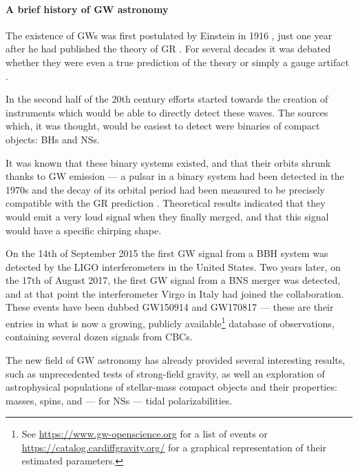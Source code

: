 \documentclass[main.tex]{subfiles}
\begin{document}

\paragraph{A brief history of GW astronomy}

The existence of \acp{GW} was first postulated by Einstein in 1916 \cites{1916SPAW.......688E}{1918SPAW.......154E}, just one year after he had published the theory of \ac{GR} \cite[]{einsteinFeldgleichungenGravitation1915}. 
For several decades it was debated whether they were even a true prediction of the theory or simply a gauge artifact \cite{kennefickTravelingSpeedThought2007}. 

In the second half of the 20th century efforts started towards the creation of instruments which would be able to directly detect these waves. 
The sources which, it was thought, would be easiest to detect were binaries of compact objects: \acp{BH} and \acp{NS}.

It was known that these binary systems existed, and that their orbits shrunk thanks to \ac{GW} emission --- a pulsar in a binary system had been detected in the 1970s and the decay of its orbital period had been measured to be precisely compatible with the \ac{GR} prediction \cites{hulseDiscoveryPulsarBinary1975}{taylorNewTestGeneral1982}.
Theoretical results indicated that they would emit a very loud signal when they finally merged, and that this signal would have a specific chirping shape. 

On the 14th of September 2015 the first \ac{GW} signal from a \ac{BBH} system was detected \cite[]{ligoscientificcollaborationandvirgocollaborationObservationGravitationalWaves2016} by the \ac{LIGO} interferometers in the United States. 
Two years later, on the 17th of August 2017, the first \ac{GW} signal from a \ac{BNS} merger \cite{abbottGW170817ObservationGravitational2017}
was detected, and at that point the interferometer Virgo in Italy had joined the collaboration.
These events have been dubbed GW150914 and GW170817 --- these are their entries in what is now a growing, publicly available\footnote{See \url{https://www.gw-openscience.org} for a list of events or \url{https://catalog.cardiffgravity.org/} for a graphical representation of their estimated parameters.} database of observations, containing several dozen signals from \acp{CBC}.

The new field of \ac{GW} astronomy has already provided several interesting results, such as unprecedented tests of strong-field gravity, as well an exploration of astrophysical populations of stellar-mass compact objects and their properties: masses, spins, and --- for \acp{NS} --- tidal polarizabilities. 
\end{document}
